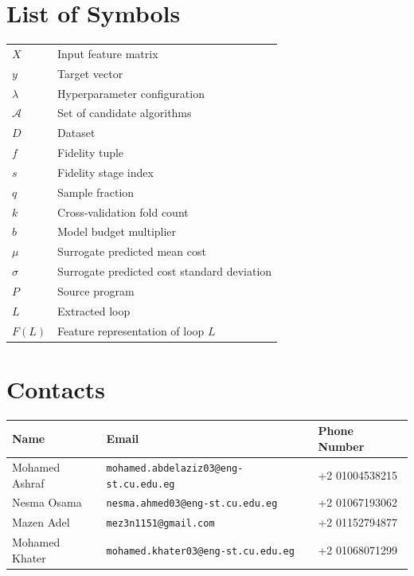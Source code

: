 \documentclass[12pt,a4paper]{report}
\newcommand{\acceleraTableStyle}{%
\small
\renewcommand{\arraystretch}{1.15}
\setlength{\tabcolsep}{4pt}%
}
\begin{document}
\clearpage
\chapter*{List of Symbols}
\begin{tabular}{ll}
$X$ & Input feature matrix \\
$y$ & Target vector \\
$\lambda$ & Hyperparameter configuration \\
$\mathcal{A}$ & Set of candidate algorithms \\
$D$ & Dataset \\
$f$ & Fidelity tuple \\
$s$ & Fidelity stage index \\
$q$ & Sample fraction \\
$k$ & Cross-validation fold count \\
$b$ & Model budget multiplier \\
$\mu$ & Surrogate predicted mean cost \\
$\sigma$ & Surrogate predicted cost standard deviation \\
$P$ & Source program \\
$L$ & Extracted loop \\
$F(L)$ & Feature representation of loop $L$ \\
\end{tabular}

\clearpage
\chapter*{Contacts}


\begin{table}[h!]
\centering
\acceleraTableStyle

\begin{tabularx}{\textwidth}{|p{}|>{\raggedright\arraybackslash}X|p{}|}
\hline
\textbf{Name} & \textbf{Email} & \textbf{Phone Number} \\ \hline
Mohamed Ashraf & \texttt{mohamed.abdelaziz03@eng-st.cu.edu.eg} & +2 01004538215 \\ \hline
Nesma Osama & \texttt{nesma.ahmed03@eng-st.cu.edu.eg} & +2 01067193062 \\ \hline
Mazen Adel & \texttt{mez3n1151@gmail.com} & +2 01152794877 \\ \hline
Mohamed Khater & \texttt{mohamed.khater03@eng-st.cu.edu.eg} & +2 01068071299 \\ \hline
\end{tabularx}

\end{table}
\end{document}
